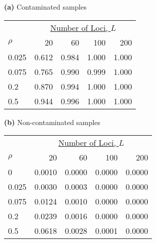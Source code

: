 {\bf (a)} Contaminated samples 
\begin{center}
\begin{tabular}{lrrrr} 
  &  \multicolumn{4}{c}{\underline{Number of Loci, $L$}} \\
$\rho~~~~~~~$  &  20              &  60              &  100             &  200             \\  
\hline 0.025   &  0.612           &  0.984           &  1.000           &  1.000           \\  
0.075           &  0.765           &  0.990           &  0.999           &  1.000           \\  
0.2             &  0.870           &  0.994           &  1.000           &  1.000           \\  
0.5             &  0.944           &  0.996           &  1.000           &  1.000           \\  
\end{tabular} 
\end{center}
{\bf (b)} Non-contaminated samples 
\begin{center}
\begin{tabular}{lrrrr} 
  &  \multicolumn{4}{c}{\underline{Number of Loci, $L$}} \\
$\rho~~~~~~~$  &  20              &  60              &  100             &  200             \\  
\hline 0       &  0.0010          &  0.0000          &  0.0000          &  0.0000          \\  
0.025           &  0.0030          &  0.0003          &  0.0000          &  0.0000          \\  
0.075           &  0.0124          &  0.0010          &  0.0000          &  0.0000          \\  
0.2             &  0.0239          &  0.0016          &  0.0000          &  0.0000          \\  
0.5             &  0.0618          &  0.0028          &  0.0001          &  0.0000          \\  
\end{tabular} 
\end{center}
